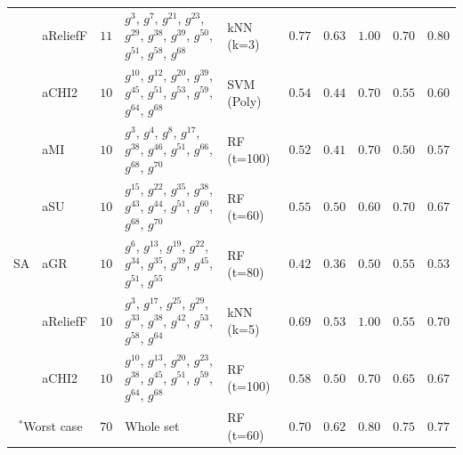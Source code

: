 \begin{table}[!ht]
{\begin{tabular}{llllllllll}
  & aReliefF & $11$ & $g^{3}$, $g^{7}$, $g^{21}$, $g^{23}$, $g^{29}$, $g^{38}$, $g^{39}$, $g^{50}$, $g^{51}$, $g^{58}$, $g^{68}$ & kNN (k=3) & $0.77$ & $0.63$ & $1.00$ & $0.70$ & $0.80$ \\
  & aCHI2 & $10$ & $g^{10}$, $g^{12}$, $g^{20}$, $g^{39}$, $g^{45}$, $g^{51}$, $g^{53}$, $g^{59}$, $g^{64}$, $g^{68}$ & SVM (Poly) & $0.54$ & $0.44$ & $0.70$ & $0.55$ & $0.60$ \\
\hline
\multirow{5}{*}{SA}
  & aMI & $10$ & $g^{3}$, $g^{4}$, $g^{8}$, $g^{17}$, $g^{38}$, $g^{46}$, $g^{51}$, $g^{66}$, $g^{68}$, $g^{70}$ & RF (t=100) & $0.52$ & $0.41$ & $0.70$ & $0.50$ & $0.57$ \\
  & aSU & $10$ & $g^{15}$, $g^{22}$, $g^{35}$, $g^{38}$, $g^{43}$, $g^{44}$, $g^{51}$, $g^{60}$, $g^{68}$, $g^{70}$ & RF (t=60) & $0.55$ & $0.50$ & $0.60$ & $0.70$ & $0.67$ \\
  & aGR & $10$ & $g^{6}$, $g^{13}$, $g^{19}$, $g^{22}$, $g^{34}$, $g^{35}$, $g^{39}$, $g^{45}$, $g^{51}$, $g^{55}$ & RF (t=80) & $0.42$ & $0.36$ & $0.50$ & $0.55$ & $0.53$ \\
  & aReliefF & $10$ & $g^{3}$, $g^{17}$, $g^{25}$, $g^{29}$, $g^{33}$, $g^{38}$, $g^{42}$, $g^{53}$, $g^{58}$, $g^{64}$ & kNN (k=5) & $0.69$ & $0.53$ & $1.00$ & $0.55$ & $0.70$ \\
  & aCHI2 & $10$ & $g^{10}$, $g^{13}$, $g^{20}$, $g^{23}$, $g^{38}$, $g^{45}$, $g^{51}$, $g^{59}$, $g^{64}$, $g^{68}$ & RF (t=100) & $0.58$ & $0.50$ & $0.70$ & $0.65$ & $0.67$ \\
\hline
\multicolumn{2}{c}{$^*$Worst case} & $70$ & Whole set & RF (t=60) & $0.70$ & $0.62$ & $0.80$ & $0.75$ & $0.77$ \\
\hline
\end{tabular}
}
\end{table}
